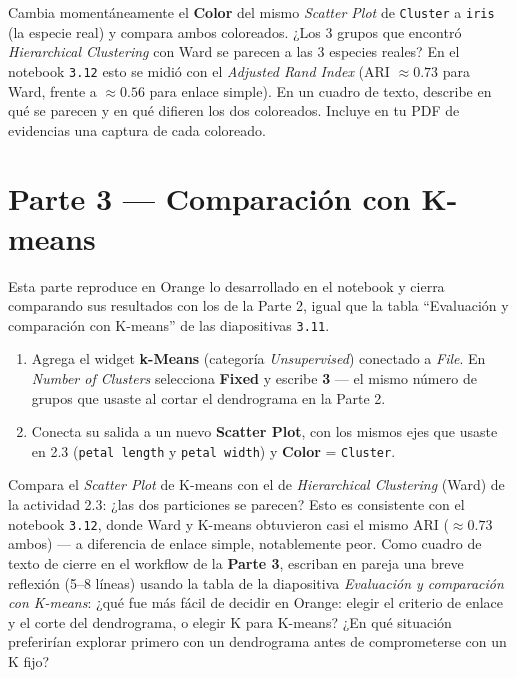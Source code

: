 \documentclass[11pt,letterpaper]{article}
\newcommand{\faPencil}{\raisebox{-0.1em}{\textbf{\Large\textbullet}}}
\begin{document}
\begin{actividad}
Cambia momentáneamente el \textbf{Color} del mismo \textit{Scatter Plot} de \texttt{Cluster} a \texttt{iris} (la especie real) y compara ambos coloreados. ¿Los 3 grupos que encontró \textit{Hierarchical Clustering} con Ward se parecen a las 3 especies reales? En el notebook \texttt{3.12} esto se midió con el \textit{Adjusted Rand Index} (ARI $\approx 0.73$ para Ward, frente a $\approx 0.56$ para enlace simple). En un cuadro de texto, describe en qué se parecen y en qué difieren los dos coloreados. Incluye en tu PDF de evidencias una captura de cada coloreado.
\end{actividad}

\section{Parte 3 --- Comparación con K-means}

Esta parte reproduce en Orange lo desarrollado en el notebook \texttt{} y cierra comparando sus resultados con los de la Parte 2, igual que la tabla ``Evaluación y comparación con K-means'' de las diapositivas \texttt{3.11}.

\begin{enumerate}[leftmargin=1.2cm]
  \item Agrega el widget \textbf{k-Means} (categoría \textit{Unsupervised}) conectado a \textit{File}. En \textit{Number of Clusters} selecciona \textbf{Fixed} y escribe \textbf{3} --- el mismo número de grupos que usaste al cortar el dendrograma en la Parte 2.
  \item Conecta su salida a un nuevo \textbf{Scatter Plot}, con los mismos ejes que usaste en 2.3 (\texttt{petal length} y \texttt{petal width}) y \textbf{Color} = \texttt{Cluster}.
\end{enumerate}

\begin{actividad}[title={\faPencil\ Reflexión final}]
Compara el \textit{Scatter Plot} de K-means con el de \textit{Hierarchical Clustering} (Ward) de la actividad 2.3: ¿las dos particiones se parecen? Esto es consistente con el notebook \texttt{3.12}, donde Ward y K-means obtuvieron casi el mismo ARI ($\approx 0.73$ ambos) --- a diferencia de enlace simple, notablemente peor. Como cuadro de texto de cierre en el workflow de la \textbf{Parte 3}, escriban en pareja una breve reflexión (5--8 líneas) usando la tabla de la diapositiva \textit{Evaluación y comparación con K-means}: ¿qué fue más fácil de decidir en Orange: elegir el criterio de enlace y el corte del dendrograma, o elegir K para K-means? ¿En qué situación preferirían explorar primero con un dendrograma antes de comprometerse con un K fijo?
\end{actividad}
\end{document}
